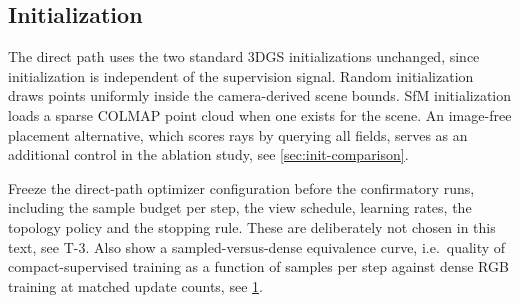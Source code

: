 \subsection{Initialization}
\label{sec:init}

The direct path uses the two standard 3DGS initializations unchanged, since
initialization is independent of the supervision signal.  Random initialization draws
points uniformly inside the camera-derived scene bounds.  SfM initialization loads a
sparse COLMAP point cloud when one exists for the scene.    An image-free placement alternative, which scores rays by querying
all fields, serves as an additional control in the ablation study, see
\cref{sec:init-comparison}.

\begin{TodoBlock}
Freeze the direct-path optimizer configuration before the confirmatory runs, including the
sample budget per step, the view schedule, learning rates, the topology policy and the
stopping rule.  These are deliberately not chosen in this text, see T-3.  Also show a
sampled-versus-dense equivalence curve, i.e.\ quality of compact-supervised training as a
function of samples per step against dense RGB training at matched update counts, see
\cref{fig:sample-budget}.
\end{TodoBlock}

\begin{figure}[t]
  \centering
  \caption{}
  \label{fig:sample-budget}
\end{figure}
